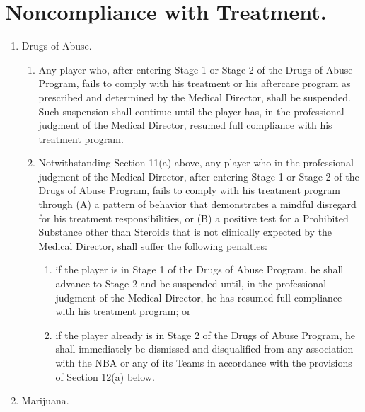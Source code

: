 \documentclass[
]{book}
\providecommand{\tightlist}{%
  \setlength{\itemsep}{0pt}\setlength{\parskip}{0pt}}
\begin{document}
\hypertarget{noncompliance-with-treatment.}{%
\section{Noncompliance with Treatment.}\label{noncompliance-with-treatment.}}

\begin{enumerate}
\def\labelenumi{(\alph{enumi})}
\item
  Drugs of Abuse.

  \begin{enumerate}
  \def\labelenumii{(\roman{enumii})}
  \tightlist
  \item
    Any player who, after entering Stage 1 or Stage 2 of the Drugs of Abuse Program, fails to comply with his treatment or his aftercare program as prescribed and determined by the Medical Director, shall be suspended. Such suspension shall continue until the player has, in the professional judgment of the Medical Director, resumed full compliance with his treatment program.
  \item
    Notwithstanding Section 11(a) above, any player who in the professional judgment of the Medical Director, after entering Stage 1 or Stage 2 of the Drugs of Abuse Program, fails to comply with his treatment program through (A) a pattern of behavior that demonstrates a mindful disregard for his treatment responsibilities, or (B) a positive test for a Prohibited Substance other than Steroids that is not clinically expected by the Medical Director, shall suffer the following penalties:

    \begin{enumerate}
    \def\labelenumiii{(\arabic{enumiii})}
    \tightlist
    \item
      if the player is in Stage 1 of the Drugs of Abuse Program, he shall advance to Stage 2 and be suspended until, in the professional judgment of the Medical Director, he has resumed full compliance with his treatment program; or
    \item
      if the player already is in Stage 2 of the Drugs of Abuse Program, he shall immediately be dismissed and disqualified from any association with the NBA or any of its Teams in accordance with the provisions of Section 12(a) below.
    \end{enumerate}
  \end{enumerate}
\item
  Marijuana.


\end{enumerate}
\end{document}
